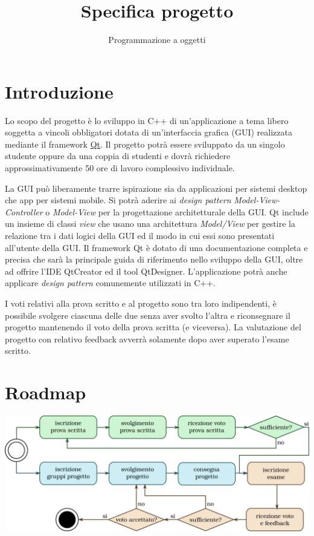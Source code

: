 \documentclass[10pt,a4paper,oneside]{article}
\title{Specifica progetto}
\author{Programmazione a oggetti}
\begin{document}
\maketitle

\section{Introduzione}
Lo scopo del progetto è lo sviluppo in C++ di un'applicazione a tema libero soggetta a vincoli obbligatori dotata di un'interfaccia grafica (GUI) realizzata mediante il framework \href{https://www.qt.io/?hsLang=en}{Qt}. Il progetto potrà essere sviluppato da un singolo studente oppure da una coppia di studenti e dovrà richiedere approssimativamente 50 ore di lavoro complessivo individuale.

La GUI può liberamente trarre ispirazione sia da applicazioni per sistemi desktop che app per sistemi mobile. Si potrà aderire ai \emph{design pattern} \emph{Model-View-Controller} o \emph{Model-View} per la progettazione architetturale della GUI. Qt include un insieme di classi \emph{view} che usano una architettura \emph{Model/View} per gestire la relazione tra i dati logici della GUI ed il modo in cui essi sono presentati all'utente della GUI. Il framework Qt è dotato di una documentazione completa e precisa che sarà la principale guida di riferimento nello sviluppo della GUI, oltre ad offrire l'IDE QtCreator ed il tool QtDesigner. L'applicazione potrà anche applicare \emph{design pattern} comunemente utilizzati in C++.

I voti relativi alla prova scritto e al progetto sono tra loro indipendenti, è possibile svolgere ciascuna delle due senza aver svolto l'altra e riconsegnare il progetto mantenendo il voto della prova scritta (e viceversa). La valutazione del progetto con relativo feedback avverrà solamente dopo aver superato l'esame scritto.

\section{Roadmap}
\includegraphics[width=1\textwidth]{assets/roadmap}
\end{document}
